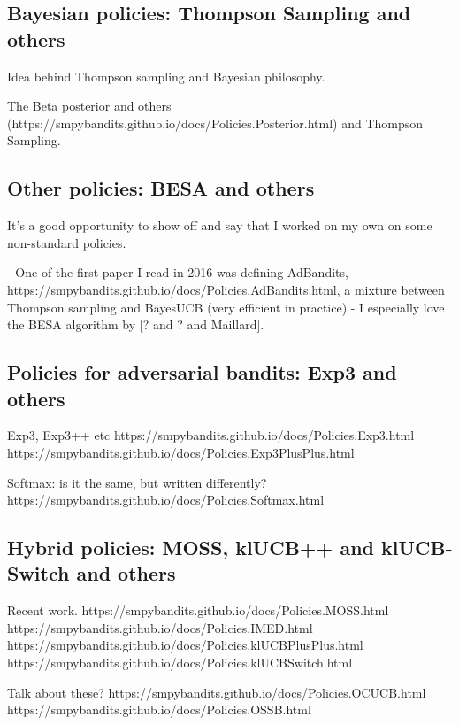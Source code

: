 \subsection{Bayesian policies: Thompson Sampling and others}

Idea behind Thompson sampling and Bayesian philosophy.

The Beta posterior and others (https://smpybandits.github.io/docs/Policies.Posterior.html) and Thompson Sampling.


\subsection{Other policies: BESA and others}

It's a good opportunity to show off and say that I worked on my own on some non-standard policies.

- One of the first paper I read in 2016 was defining AdBandits, https://smpybandits.github.io/docs/Policies.AdBandits.html, a mixture between Thompson sampling and BayesUCB (very efficient in practice)
- I especially love the BESA algorithm by [? and ? and Maillard].


\subsection{Policies for adversarial bandits: Exp3 and others}

Exp3, Exp3++ etc
https://smpybandits.github.io/docs/Policies.Exp3.html
https://smpybandits.github.io/docs/Policies.Exp3PlusPlus.html

Softmax: is it the same, but written differently?
https://smpybandits.github.io/docs/Policies.Softmax.html


\subsection{Hybrid policies: MOSS, klUCB++ and klUCB-Switch and others}

Recent work.
https://smpybandits.github.io/docs/Policies.MOSS.html
https://smpybandits.github.io/docs/Policies.IMED.html
https://smpybandits.github.io/docs/Policies.klUCBPlusPlus.html
https://smpybandits.github.io/docs/Policies.klUCBSwitch.html

Talk about these?
https://smpybandits.github.io/docs/Policies.OCUCB.html
https://smpybandits.github.io/docs/Policies.OSSB.html

